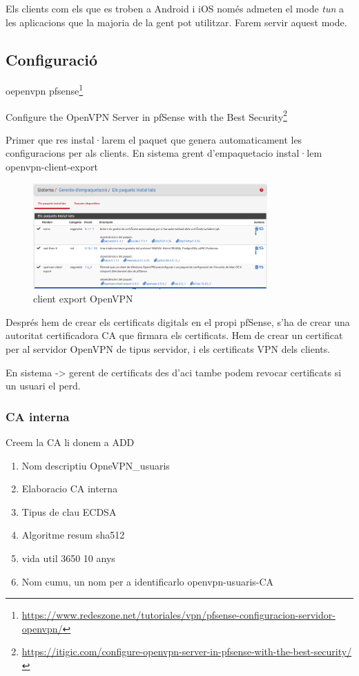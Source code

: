 \documentclass[
  10pt,
]{krantz}
\DeclareRobustCommand{\href}[2]{#2\footnote{\url{#1}}}
\providecommand{\tightlist}{%
  \setlength{\itemsep}{0pt}\setlength{\parskip}{0pt}}
\begin{document}
Els clients com els que es troben a Android i iOS només admeten el mode \emph{tun} a les aplicacions que la majoria de la gent pot utilitzar. Farem servir aquest mode.

\hypertarget{configuraciuxf3-1}{%
\subsection{Configuració}\label{configuraciuxf3-1}}

\href{https://www.redeszone.net/tutoriales/vpn/pfsense-configuracion-servidor-openvpn/}{oepenvpn pfsense}

\href{https://itigic.com/configure-openvpn-server-in-pfsense-with-the-best-security/}{Configure the OpenVPN Server in pfSense with the Best Security}

Primer que res instal·larem el paquet que genera automaticament les configuracions per als clients. En sistema grent d'empaquetacio instal·lem openvpn-client-export

\begin{figure}
\centering
\includegraphics[width=0.8\textwidth,height=\textheight]{imatges/proxmox/client_openVPN.png}
\caption{client export OpenVPN}
\end{figure}

Després hem de crear els certificats digitals en el propi pfSense, s'ha de crear una autoritat certificadora CA que firmara els certificats. Hem de crear un certificat per al servidor OpenVPN de tipus servidor, i els certificats VPN dels clients.

En sistema -\textgreater{} gerent de certificats des d'aci tambe podem revocar certificats si un usuari el perd.

\hypertarget{ca-interna}{%
\subsubsection{CA interna}\label{ca-interna}}

Creem la CA li donem a ADD

\begin{enumerate}
\def\labelenumi{\arabic{enumi}.}
\tightlist
\item
  Nom descriptiu OpneVPN\_usuaris
\item
  Elaboracio CA interna
\item
  Tipus de clau ECDSA
\item
  Algoritme resum sha512
\item
  vida util 3650 10 anys
\item
  Nom cumu, un nom per a identificarlo openvpn-usuaris-CA
\end{enumerate}
\end{document}

